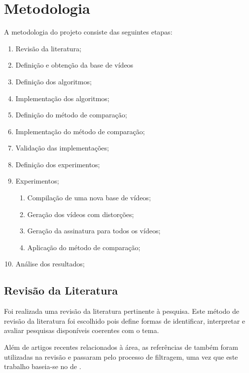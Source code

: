 
\chapter{Metodologia}
\label{chap:metodologia}

A metodologia do projeto consiste das seguintes etapas:

\begin{enumerate}
\item Revisão da literatura;
\item Definição e obtenção da base de vídeos
\item Definição dos algoritmos;
\item Implementação dos algoritmos; 
\item Definição do método de comparação;
\item Implementação do método de comparação;
\item Validação das implementações;
\item Definição dos experimentos;
\item Experimentos;
	\begin{enumerate}
		\item Compilação de uma nova base de vídeos;
        \item Geração dos vídeos com distorções;
        \item Geração da assinatura para todos os vídeos;
        \item Aplicação do método de comparação;
	\end{enumerate}
\item Análise dos resultados;
\end{enumerate}

\section{Revisão da Literatura}

Foi realizada uma revisão da literatura pertinente à pesquisa. Este método de revisão da literatura foi escolhido pois define formas de identificar, interpretar e avaliar pesquisas disponíveis coerentes com o tema. 

Além de artigos recentes relacionados à área, as referências de \citeauthor{sylvio2015} também foram utilizadas na revisão e passaram pelo processo de filtragem, uma vez que este trabalho baseia-se no de \citeauthor{sylvio2015}.

